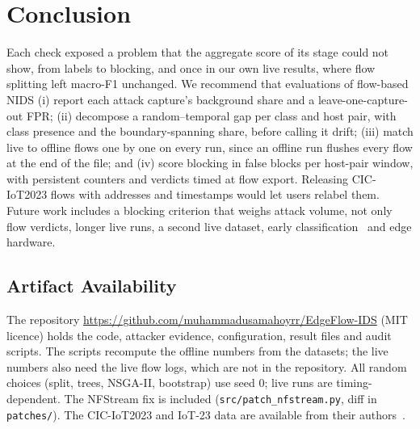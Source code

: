 \section{Conclusion}\label{sec:conclusion}

Each check exposed a problem that the aggregate score of its stage could not show, from labels to blocking, and once in our own live results, where flow splitting left macro-F1 unchanged. We recommend that evaluations of flow-based NIDS (i) report each attack capture's background share and a leave-one-capture-out FPR; (ii) decompose a random--temporal gap per class and host pair, with class presence and the boundary-spanning share, before calling it drift; (iii) match live to offline flows one by one on every run, since an offline run flushes every flow at the end of the file; and (iv) score blocking in false blocks per host-pair window, with persistent counters and verdicts timed at flow export. Releasing CIC-IoT2023 flows with addresses and timestamps would let users relabel them. Future work includes a blocking criterion that weighs attack volume, not only flow verdicts, longer live runs, a second live dataset, early classification~\cite{pekar2025early} and edge hardware.

\subsection{Artifact Availability}

The repository \url{https://github.com/muhammadusamahoyrr/EdgeFlow-IDS} (MIT licence) holds the code, attacker evidence, configuration, result files and audit scripts. The scripts recompute the offline numbers from the datasets; the live numbers also need the live flow logs, which are not in the repository. All random choices (split, trees, NSGA-II, bootstrap) use seed 0; live runs are timing-dependent. The NFStream fix is included (\nolinkurl{src/patch_nfstream.py}, diff in \nolinkurl{patches/}).
The CIC-IoT2023 and IoT-23 data are available from their authors~\cite{neto2023ciciot2023,garcia2020iot23}.
